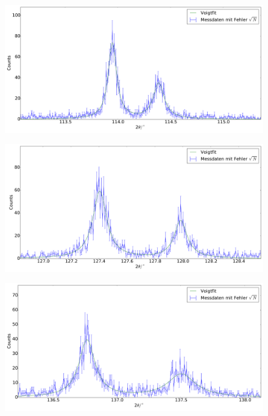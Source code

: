 \begin{figure}[H]
\begin{minipage}{.5\textwidth}
  \centering
  \includegraphics[scale=0.15]{messung_pulver_9}
  \label{fig:pul_mess_9}
\end{minipage}
\hspace{0.5cm}
\begin{minipage}{.5\textwidth}
  \centering
  \includegraphics[scale=0.15]{messung_pulver_10}
  \label{fig:pul_mess_10}
\end{minipage}
\end{figure}
\begin{figure}[H]
\begin{minipage}{.5\textwidth}
  \centering
  \includegraphics[scale=0.15]{messung_pulver_11}
  \label{fig:pul_mess_11}
\end{minipage}
\end{figure}
